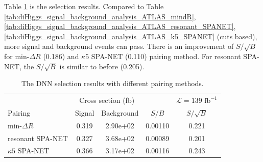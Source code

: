 \documentclass[12pt]{article}
\begin{document}
	Table \ref{tab:DNN_selection_results} is the selection results. Compared to Table \ref{tab:diHiggs_signal_background_analysis_ATLAS_mindR}, \ref{tab:diHiggs_signal_background_analysis_ATLAS_resonant_SPANET}, \ref{tab:diHiggs_signal_background_analysis_ATLAS_k5_SPANET} (cuts based), more signal and background events can pass. There is an improvement of $S / \sqrt{B}$ for $\text{min-}\Delta R$ (0.186) and $\kappa 5$ SPA-NET (0.110) pairing method. For resonant SPA-NET, the  $S / \sqrt{B}$ is similar to before (0.205).
		\begin{table}[htpb]
			\centering
			\caption{The DNN selection results with different pairing methods.}
			\label{tab:DNN_selection_results}
			\begin{tabular}{l|cc|c|c}
								  & \multicolumn{2}{c|}{Cross section (fb)} &         & $\mathcal{L} = 139 \text{ fb}^{-1}$ \\
			Pairing               & Signal           & Background           & $S / B$ & $S/\sqrt{B}$                        \\ \hline
			$\text{min-}\Delta R$ & 0.319            & 2.90e+02             & 0.00110 & 0.221                               \\
			resonant SPA-NET      & 0.327            & 3.68e+02             & 0.00089 & 0.201                               \\
			$\kappa 5$ SPA-NET    & 0.366            & 3.17e+02             & 0.00116 & 0.243                              
			\end{tabular}     
		\end{table}

\end{document}
